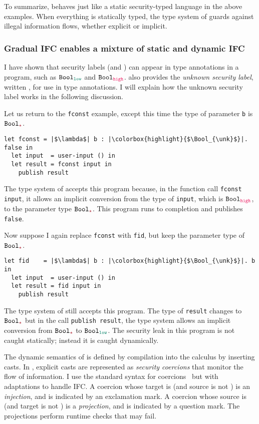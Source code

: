 To summarize, \Surface behaves just like a static security-typed language in the
above examples. When everything is statically typed, the type system of \Surface
guards against illegal information flows, whether explicit or implicit.

\subsubsection{Gradual IFC enables a mixture of static and dynamic IFC}

I have shown that security labels (\low and \high) can appear in type
annotations in a program, such as $\Bool_{\low}$ and $\Bool_{\high}$. \Surface
also provides the \textit{unknown security label}, written \unk, for use in type
annotations. I will explain how the unknown security label works in the
following discussion.

Let us return to the \texttt{fconst} example, except this time the type of
parameter \texttt{b} is $\Bool_{\unk}$.

\begin{lstlisting}[style=tt]
  let fconst = |$\lambda$| b : |\colorbox{highlight}{$\Bool_{\unk}$}|. false in
  let input  = user-input () in
  let result = fconst input in
    publish result
\end{lstlisting}

\noindent The type system of \Surface accepts this program because, in
the function call \texttt{fconst input}, it allows an implicit conversion from
the type of \texttt{input}, which is $\Bool_{\high}$, to the parameter
type $\Bool_{\unk}$. This program runs to completion and publishes
\texttt{false}.

Now suppose I again replace \texttt{fconst} with \texttt{fid}, but keep the
parameter type of $\Bool_{\unk}$.

\begin{lstlisting}[style=tt]
  let fid    = |$\lambda$| b : |\colorbox{highlight}{$\Bool_{\unk}$}|. b in
  let input  = user-input () in
  let result = fid input in
    publish result
\end{lstlisting}

\noindent The type system of \Surface still accepts this program. The type of
\texttt{result} changes to $\Bool_{\unk}$ but in the call \texttt{publish
  result}, the type system allows an implicit conversion from $\Bool_{\unk}$ to
$\Bool_{\low}$. The security leak in this program is not caught statically;
instead it is caught dynamically.

The dynamic semantics of \Surface is defined by compilation into the \CC
calculus by inserting casts. In \CC, explicit casts are represented as
\textit{security coercions} that monitor the flow of information. I use the
standard syntax for coercions~\parencite{Henglein:1994nz} but with adaptations
to handle IFC. A coercion whose target is \unk (and source is not \unk) is an
\emph{injection}, and is indicated by an exclamation mark. A coercion whose
source is \unk (and target is not \unk) is a \emph{projection}, and is indicated
by a question mark. The projections perform runtime checks that may fail.

